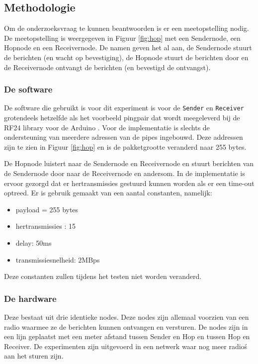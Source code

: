 \documentclass{article}
\begin{document}
\subsection{Methodologie}
Om de onderzoeksvraag te kunnen beantwoorden is er een meetopstelling nodig. De meetopstelling is weergegeven in Figuur \ref{fig:hop} met een Sendernode, een Hopnode en een Receivernode.
De namen geven het al aan, de Sendernode stuurt de berichten (en wacht op bevestiging), de Hopnode stuurt de berichten door en de Receivernode ontvangt de berichten (en bevestigd de ontvangst).  

\subsubsection{De software}

De software die gebruikt is voor dit experiment is voor de 
\texttt{Sender} en \texttt{Receiver} grotendeels hetzelfde als het voorbeeld pingpair dat wordt meegeleverd bij de RF24 library voor de Arduino \cite{rf24}. Voor de implementatie is slechts de ondersteuning van meerdere adressen van de pipes ingebouwd. Deze addressen zijn te zien in Figuur \ref{fig:hop} en is de pakketgrootte veranderd naar 255 bytes. 

De Hopnode luistert naar de Sendernode en Receivernode en stuurt berichten van de Sendernode door naar de Receivernode en andersom. In de implementatie is ervoor gezorgd dat er hertransmissies gestuurd kunnen worden als er een time-out optreed.
Er is gebruik gemaakt van een aantal constanten, namelijk:

\begin{itemize}
	\item payload = 255 bytes
	\item hertransmissies : 15
	\item delay: 50ms
	\item transmissiesnelheid: 2MBps
\end{itemize}  
Deze constanten zullen tijdens het testen niet worden veranderd.

\subsubsection{De hardware}

Deze bestaat uit drie identieke nodes. Deze nodes zijn allemaal voorzien van een radio waarmee ze de berichten kunnen ontvangen en versturen. De nodes zijn in een lijn geplaatst met een meter afstand tussen Sender en Hop en tussen Hop en Receiver. De experimenten zijn uitgevoerd in een netwerk waar nog meer radio\'s aan het sturen zijn.
 
\end{document}

